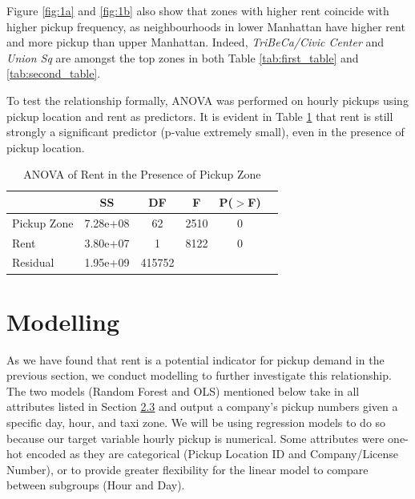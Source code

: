 \documentclass[11pt]{article}
\begin{document}
Figure \ref{fig:1a} and \ref{fig:1b} also show that zones with higher rent coincide with higher pickup frequency, as neighbourhoods in lower Manhattan have higher rent and more pickup than upper Manhattan. Indeed, \textit{TriBeCa/Civic Center} and \textit{Union Sq} are amongst the top zones in both Table \ref{tab:first_table} and \ref{tab:second_table}.
\begin{table}[!htb]
\begin{minipage}[b]{.45\linewidth}
    To test the relationship formally, ANOVA was performed on hourly pickups using pickup location and rent as predictors. It is evident in Table \ref{tab:3} that rent is still strongly a significant predictor (p-value extremely small), even in the presence of pickup location.
\end{minipage}\hfill
\begin{minipage}[b]{.5\linewidth}
    \raggedleft
    \medskip

    \caption{ANOVA of Rent in the Presence of Pickup Zone} \label{tab:3}
    \begin{tabular}{ l c c c c c } 
      \hline
      &SS  & DF  & F  &P($>$F) \\
        \hline
        Pickup Zone & 7.28e+08 & 62 & 2510 & 0 \\
        Rent & 3.80e+07 & 1 & 8122 & 0 \\
      \hline
    Residual & 1.95e+09 & 415752 & & \\
     \hline
    \end{tabular}
\end{minipage}
\end{table}

\section{Modelling}
As we have found that rent is a potential indicator for pickup demand in the previous section, we conduct modelling to further investigate this relationship. The two models (Random Forest and OLS) mentioned below take in all attributes listed in Section \hyperlink{subsection.2.3}{2.3} and output a company's pickup numbers given a specific day, hour, and taxi zone. We will be using regression models to do so because our target variable hourly pickup is numerical. Some attributes were one-hot encoded as they are categorical (Pickup Location ID and Company/License Number), or to provide greater flexibility for the linear model to compare between subgroups (Hour and Day).
\end{document}
